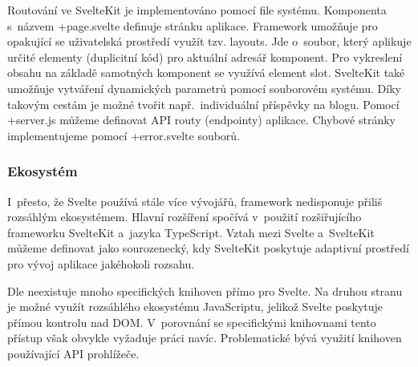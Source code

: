 Routování ve SvelteKit je implementováno pomocí file systému. Komponenta s~názvem +page.svelte definuje stránku aplikace. 
Framework umožňuje pro opakující se uživatelská prostředí využít tzv. layouts. Jde o~soubor, který aplikuje určité elementy (duplicitní kód) pro aktuální adresář komponent. 
Pro vykreslení obsahu na základě samotných komponent se využívá element slot. SvelteKit také umožňuje vytváření dynamických parametrů pomocí souborovém systému. 
Díky takovým cestám je možné tvořit např.~individuální příspěvky na blogu. Pomocí +server.js můžeme definovat API routy (endpointy) aplikace. 
Chybové stránky implementujeme pomocí +error.svelte souborů.\cite{svelte,sveltekit}

\subsubsection{Ekosystém}

I~přesto, že Svelte používá stále více vývojářů, framework nedisponuje přiliš rozsáhlým ekosystémem. Hlavní rozšíření spočívá v~použití rozšiřujícího frameworku SvelteKit a~jazyka TypeScript. 
Vztah mezi Svelte a~SvelteKit můžeme definovat jako sourozenecký, kdy SvelteKit poskytuje adaptivní prostředí pro vývoj aplikace jakéhokoli rozsahu.

Dle \cite{sveltedailydev} neexistuje mnoho specifických knihoven přímo pro Svelte. 
Na druhou stranu je možné využít rozsáhlého ekosystému JavaScriptu, jelikož Svelte poskytuje přímou kontrolu nad DOM. 
V~porovnání se specifickými knihovnami tento přístup však obvykle vyžaduje práci navíc. 
Problematické bývá využití knihoven používající API prohlížeče.\cite{svelteheyreliable,sveltedailydev,sveltejslibs}
